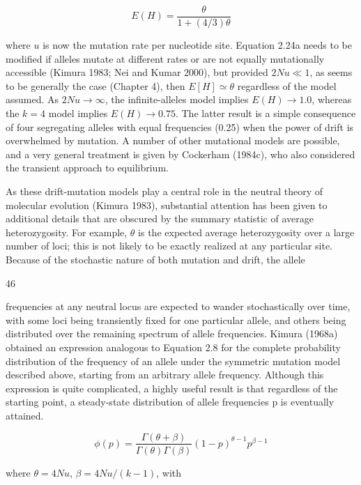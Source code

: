 \documentclass{article}
\begin{document}
\begin{equation}
E(H)=\frac{\theta}{1+(4/3)\theta}
\tag{2.24c}
\label{eq:2_24c}
\end{equation}

where $u$ is now the mutation rate per nucleotide site. Equation 2.24a needs to be modified if alleles mutate at different rates or are not equally mutationally accessible (Kimura 1983; Nei and Kumar 2000), but provided $2Nu \ll 1$, as seems to be generally the case (Chapter 4), then $E[H] \simeq \theta$ regardless of the model assumed. As $2Nu \to \infty$, the infinite-alleles model implies $E(H) \to 1.0$, whereas the $k = 4$ model implies $E(H) \to 0.75$. The latter result is a simple consequence of four segregating alleles with equal frequencies (0.25) when the power of drift is overwhelmed by mutation. A number of other mutational models are possible, and a very general treatment is given by Cockerham (1984c), who also considered the transient approach to equilibrium.

As these drift-mutation models play a central role in the neutral theory of molecular evolution (Kimura 1983), substantial attention has been given to additional details that are obscured by the summary statistic of average heterozygosity. For example,  $ \theta $ is the expected average heterozygosity over a large number of loci; this is not likely to be exactly realized at any particular site. Because of the stochastic nature of both mutation and drift, the allele

46

frequencies at any neutral locus are expected to wander stochastically over time, with some loci being transiently fixed for one particular allele, and others being distributed over the remaining spectrum of allele frequencies. Kimura (1968a) obtained an expression analogous to Equation 2.8 for the complete probability distribution of the frequency of an allele under the symmetric mutation model described above, starting from an arbitrary allele frequency. Although this expression is quite complicated, a highly useful result is that regardless of the starting point, a steady-state distribution of allele frequencies p is eventually attained.

\begin{equation}
\phi(p)=\frac{\Gamma(\theta+\beta)}{\Gamma(\theta)\Gamma(\beta)}(1-p)^{\theta-1}p^{\beta-1}
\tag{2.25a}
\label{eq:2_25a}
\end{equation}

where  $ \theta = 4Nu $,  $ \beta = 4Nu/(k - 1) $, with
\end{document}
